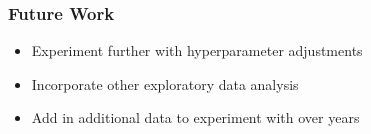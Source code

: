 \documentclass{beamer}
\begin{document}
\begin{frame}

    \frametitle{Future Work}
    \begin{itemize}
      \item Experiment further with hyperparameter adjustments
      \item Incorporate other exploratory data analysis
      \item Add in additional data to experiment with over years
    \end{itemize}


\end{frame}
\end{document}
